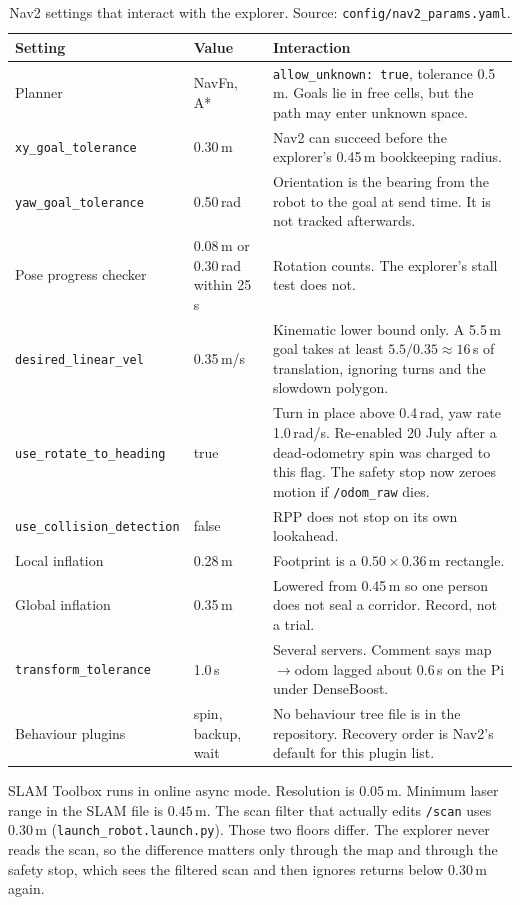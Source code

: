 \documentclass[11pt]{article}
\begin{document}
\begin{table}[ht]
\centering
\caption{Nav2 settings that interact with the explorer. Source: \texttt{config/nav2\_params.yaml}.}
\label{tab:nav}
\small
\begin{tabular}{@{}p{5.6cm}p{2.2cm}p{6.4cm}@{}}
\toprule
Setting & Value & Interaction \\
\midrule
Planner & NavFn, A* & \texttt{allow\_unknown: true}, tolerance 0.5\,m. Goals lie in free cells, but the path may enter unknown space. \\
\texttt{xy\_goal\_tolerance} & 0.30\,m & Nav2 can succeed before the explorer's 0.45\,m bookkeeping radius. \\
\texttt{yaw\_goal\_tolerance} & 0.50\,rad & Orientation is the bearing from the robot to the goal at send time. It is not tracked afterwards. \\
Pose progress checker & 0.08\,m or 0.30\,rad within 25\,s & Rotation counts. The explorer's stall test does not. \\
\texttt{desired\_linear\_vel} & 0.35\,m/s & Kinematic lower bound only. A 5.5\,m goal takes at least $5.5/0.35\approx 16$\,s of translation, ignoring turns and the slowdown polygon. \\
\texttt{use\_rotate\_to\_heading} & true & Turn in place above 0.4\,rad, yaw rate 1.0\,rad/s. Re-enabled 20 July after a dead-odometry spin was charged to this flag. The safety stop now zeroes motion if \texttt{/odom\_raw} dies. \\
\texttt{use\_collision\_detection} & false & RPP does not stop on its own lookahead. \\
Local inflation & 0.28\,m & Footprint is a $0.50\times 0.36$\,m rectangle. \\
Global inflation & 0.35\,m & Lowered from 0.45\,m so one person does not seal a corridor. Record, not a trial. \\
\texttt{transform\_tolerance} & 1.0\,s & Several servers. Comment says map$\rightarrow$odom lagged about 0.6\,s on the Pi under DenseBoost. \\
Behaviour plugins & spin, backup, wait & No behaviour tree file is in the repository. Recovery order is Nav2's default for this plugin list. \\
\bottomrule
\end{tabular}
\end{table}

SLAM Toolbox runs in online async mode. Resolution is $0.05$\,m. Minimum laser range in the SLAM file is $0.45$\,m. The scan filter that actually edits \texttt{/scan} uses $0.30$\,m (\texttt{launch\_robot.launch.py}). Those two floors differ. The explorer never reads the scan, so the difference matters only through the map and through the safety stop, which sees the filtered scan and then ignores returns below $0.30$\,m again.
\end{document}

